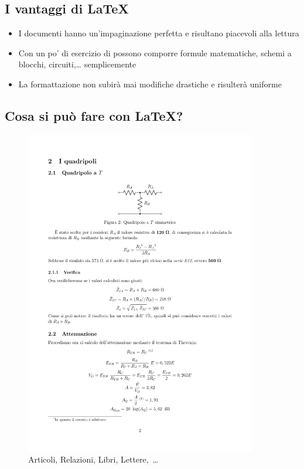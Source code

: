 \documentclass[a4paper,12pt]{article}
\newcommand{\1}{\ensuremath{\mathds{1}}}
\begin{document}
  \subsection{I vantaggi di \LaTeX}
\begin{itemize}
\item I documenti hanno un'impaginazione perfetta e risultano piacevoli alla lettura
\item Con un po' di esercizio di possono comporre formule matematiche, schemi a blocchi, circuiti,\dots{} semplicemente
\item La formattazione non subirà mai modifiche drastiche e risulterà uniforme
\end{itemize}
\newpage
\subsection{Cosa si può fare con \LaTeX?}
\begin{figure}[!h]\centering
  \includegraphics[trim={0 0 0 5.2cm},clip,width=0.9\textwidth]{img/relazione}
  \caption{Articoli, Relazioni, Libri, Lettere,~\dots}
\end{figure}
\end{document}
